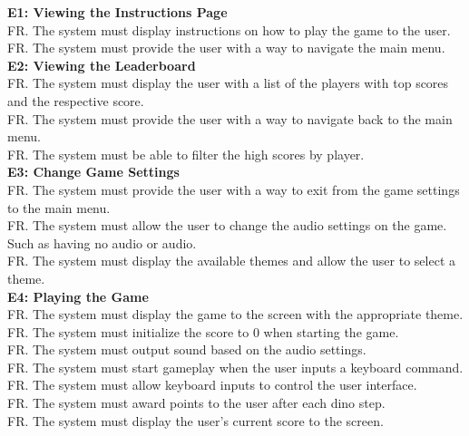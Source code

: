 \documentclass[12pt]{article}
\begin{document}
\textbf{E1: Viewing the Instructions Page} \\
FR. The system must display instructions on how to play the game to the user. \\
FR. The system must provide the user with a way to navigate the main menu. \\

\textbf{E2: Viewing the Leaderboard} \\
FR. The system must display the user with a list of the players with top scores and the respective score.  \\
FR. The system must provide the user with a way to navigate back to the main menu. \\
FR. The system must be able to filter the high scores by player. \\

\textbf{E3: Change Game Settings} \\
FR. The system must provide the user with a way to exit from the game settings to the main menu. \\

FR. The system must allow the user to change the audio settings on the game. Such as having no audio or audio. \\

FR. The system must display the available themes and allow the user to select a theme. \\

\textbf{E4: Playing the Game} \\
FR. The system must display the game to the screen with the appropriate theme. \\

FR. The system must initialize the score to 0 when starting the game. \\

FR. The system must output sound based on the audio settings. \\

FR. The system must start gameplay when the user inputs a keyboard command. \\

FR. The system must allow keyboard inputs to control the user interface. \\

FR. The system must award points to the user after each dino step. \\

FR. The system must display the user’s current score to the screen. \\
\end{document}
